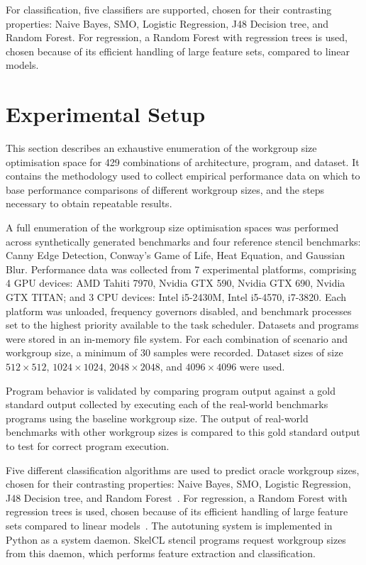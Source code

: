 \documentclass[nonatbib,preprint,9pt]{sigplanconf}
\begin{document}
For classification, five classifiers are supported, chosen for their
contrasting properties: Naive Bayes, SMO, Logistic Regression, J48
Decision tree, and Random Forest. For regression, a Random Forest with
regression trees is used, chosen because of its efficient handling of
large feature sets, compared to linear models.


\section{Experimental Setup}

This section describes an exhaustive enumeration of the workgroup size
optimisation space for 429 combinations of architecture, program, and
dataset. It contains the methodology used to collect empirical
performance data on which to base performance comparisons of different
workgroup sizes, and the steps necessary to obtain repeatable results.

A full enumeration of the workgroup size optimisation spaces was
performed across synthetically generated benchmarks and four reference
stencil benchmarks: Canny Edge Detection, Conway's Game of Life, Heat
Equation, and Gaussian Blur. Performance data was collected from 7
experimental platforms, comprising 4 GPU devices: AMD Tahiti 7970,
Nvidia GTX 590, Nvidia GTX 690, Nvidia GTX TITAN; and 3 CPU devices:
Intel i5-2430M, Intel i5-4570, i7-3820.  Each platform was unloaded,
frequency governors disabled, and benchmark processes set to the
highest priority available to the task scheduler. Datasets and
programs were stored in an in-memory file system. For each combination
of scenario and workgroup size, a minimum of 30 samples were
recorded. Dataset sizes of size $512\times512$, $1024\times1024$,
$2048\times2048$, and $4096\times4096$ were used.

Program behavior is validated by comparing program output against a
gold standard output collected by executing each of the real-world
benchmarks programs using the baseline workgroup size. The output of
real-world benchmarks with other workgroup sizes is compared to this
gold standard output to test for correct program execution.

Five different classification algorithms are used to predict oracle
workgroup sizes, chosen for their contrasting properties: Naive Bayes,
SMO, Logistic Regression, J48 Decision tree, and Random
Forest~\cite{Han2011}. For regression, a Random Forest with regression
trees is used, chosen because of its efficient handling of large
feature sets compared to linear models~\cite{Breiman1999}. The
autotuning system is implemented in Python as a system daemon. SkelCL
stencil programs request workgroup sizes from this daemon, which
performs feature extraction and classification.
\end{document}
